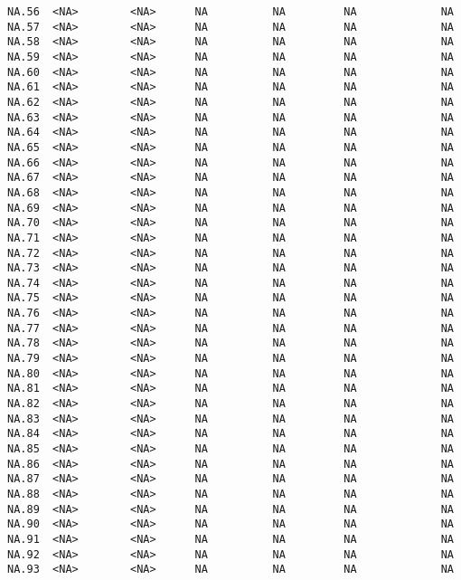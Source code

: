 \documentclass[
  letterpaper,
  DIV=11,
  numbers=noendperiod]{scrartcl}
\begin{document}
\begin{verbatim}
NA.56  <NA>        <NA>      NA          NA         NA             NA
NA.57  <NA>        <NA>      NA          NA         NA             NA
NA.58  <NA>        <NA>      NA          NA         NA             NA
NA.59  <NA>        <NA>      NA          NA         NA             NA
NA.60  <NA>        <NA>      NA          NA         NA             NA
NA.61  <NA>        <NA>      NA          NA         NA             NA
NA.62  <NA>        <NA>      NA          NA         NA             NA
NA.63  <NA>        <NA>      NA          NA         NA             NA
NA.64  <NA>        <NA>      NA          NA         NA             NA
NA.65  <NA>        <NA>      NA          NA         NA             NA
NA.66  <NA>        <NA>      NA          NA         NA             NA
NA.67  <NA>        <NA>      NA          NA         NA             NA
NA.68  <NA>        <NA>      NA          NA         NA             NA
NA.69  <NA>        <NA>      NA          NA         NA             NA
NA.70  <NA>        <NA>      NA          NA         NA             NA
NA.71  <NA>        <NA>      NA          NA         NA             NA
NA.72  <NA>        <NA>      NA          NA         NA             NA
NA.73  <NA>        <NA>      NA          NA         NA             NA
NA.74  <NA>        <NA>      NA          NA         NA             NA
NA.75  <NA>        <NA>      NA          NA         NA             NA
NA.76  <NA>        <NA>      NA          NA         NA             NA
NA.77  <NA>        <NA>      NA          NA         NA             NA
NA.78  <NA>        <NA>      NA          NA         NA             NA
NA.79  <NA>        <NA>      NA          NA         NA             NA
NA.80  <NA>        <NA>      NA          NA         NA             NA
NA.81  <NA>        <NA>      NA          NA         NA             NA
NA.82  <NA>        <NA>      NA          NA         NA             NA
NA.83  <NA>        <NA>      NA          NA         NA             NA
NA.84  <NA>        <NA>      NA          NA         NA             NA
NA.85  <NA>        <NA>      NA          NA         NA             NA
NA.86  <NA>        <NA>      NA          NA         NA             NA
NA.87  <NA>        <NA>      NA          NA         NA             NA
NA.88  <NA>        <NA>      NA          NA         NA             NA
NA.89  <NA>        <NA>      NA          NA         NA             NA
NA.90  <NA>        <NA>      NA          NA         NA             NA
NA.91  <NA>        <NA>      NA          NA         NA             NA
NA.92  <NA>        <NA>      NA          NA         NA             NA
NA.93  <NA>        <NA>      NA          NA         NA             NA
\end{verbatim}
\end{document}
